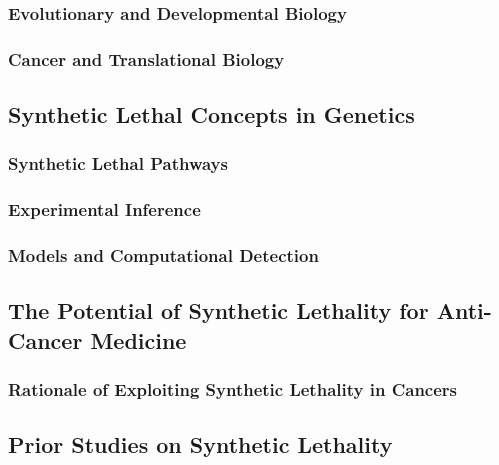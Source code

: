 \subsubsection{Evolutionary and Developmental Biology}
\subsubsection{Cancer and Translational Biology}

\subsection{Synthetic Lethal Concepts in Genetics}
\subsubsection{Synthetic Lethal Pathways}
\subsubsection{Experimental Inference}
\subsubsection{Models and Computational Detection}

\subsection{The Potential of Synthetic Lethality for Anti-Cancer Medicine}
\subsubsection{Rationale of Exploiting Synthetic Lethality in Cancers}

\subsection{Prior Studies on Synthetic Lethality}
